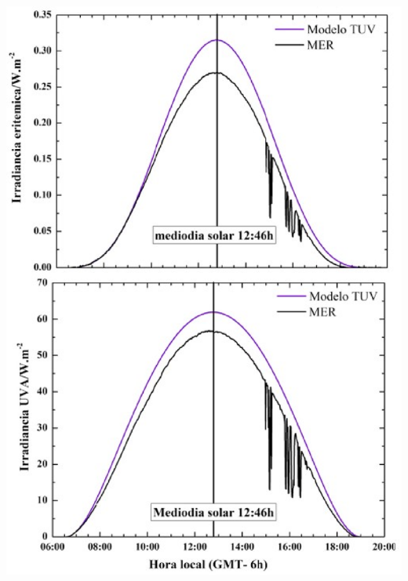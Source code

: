 \documentclass{article}
\begin{document}
\begin{minipage}{0.52\linewidth}
\includegraphics[scale=0.4]{images/espectro.eps}

\end{minipage}
\end{document}

